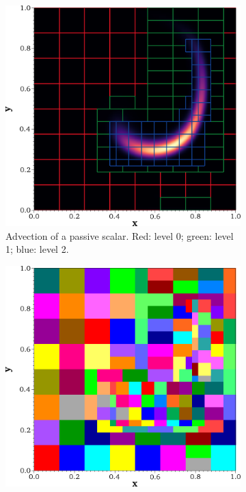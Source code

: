 \documentclass[review]{elsarticle}
\begin{document}
\begin{figure}[!tbp]%
  \centering%
  \begin{subfigure}[t]{0.32\textwidth}%
    \includegraphics[width=\textwidth]{./figs/singlevortex.png}%
    \caption{Advection of a passive scalar. Red: level 0; green: level 1; blue: level 2.}\label{fig:singlevortex}%
  \end{subfigure}\hfill%
  \begin{subfigure}[t]{0.32\textwidth}%
    \includegraphics[width=\textwidth]{./figs/proc_access.png}%

\end{subfigure}
\end{figure}
\end{document}
